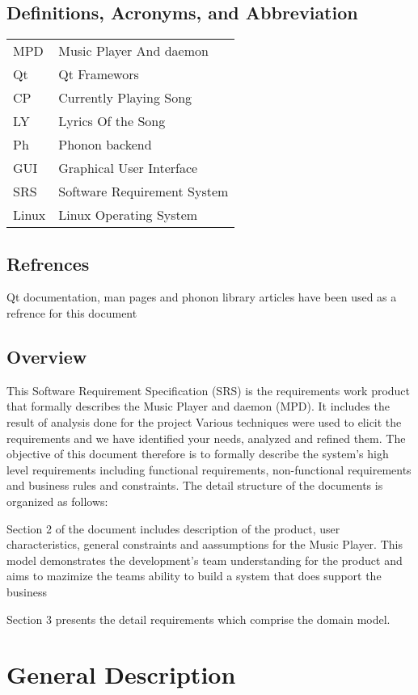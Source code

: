 \subsection{Definitions, Acronyms, and Abbreviation}
    \begin{tabular}{ll}
        MPD & Music Player And daemon \\
        Qt  & Qt Framewors \\ 
        CP & Currently Playing Song \\
        LY & Lyrics Of the Song \\
        Ph & Phonon backend \\
        GUI & Graphical User Interface \\
				SRS & Software Requirement System\\
				Linux & Linux Operating System \\
    \end{tabular}

\subsection{Refrences}
Qt documentation, man pages and phonon library articles have been used as a refrence for this document
\subsection{Overview}
This Software Requirement Specification (SRS) is the requirements work product that formally
describes the Music Player and daemon (MPD). It includes the result of analysis done
for the project  Various techniques were used to elicit the requirements and we have identified your 
needs, analyzed and refined them. The objective of this document therefore is to 
formally describe the system’s high level requirements including 
functional requirements, non-functional requirements and business rules and constraints.
The detail structure of the documents is organized as follows:

Section 2 of the document includes description of the product, user characteristics, general constraints
and aassumptions for the Music Player. This model demonstrates the development's team understanding for the product and 
aims to mazimize the teams ability to build a system that does support the business

Section 3 presents the detail requirements which comprise the domain model.
\pagebreak
\section{General Description}
